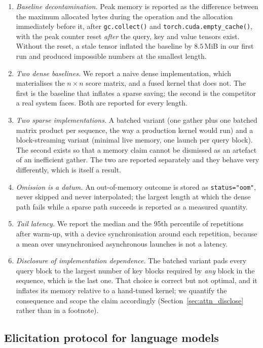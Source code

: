 \begin{enumerate}\itemsep2pt
\item \emph{Baseline decontamination.} Peak memory is reported as the difference
between the maximum allocated bytes during the operation and the allocation
immediately before it, after \texttt{gc.collect()} and
\texttt{torch.cuda.empty\_cache()}, with the peak counter reset \emph{after} the
query, key and value tensors exist. Without the reset, a stale tensor inflated the
baseline by $8.5$\,MiB in our first run and produced impossible numbers at the
smallest length.
\item \emph{Two dense baselines.} We report a naive dense implementation, which
materialises the $n\times n$ score matrix, and a fused kernel
\cite{dao2022flashattention} that does not. The first is the baseline that
inflates a sparse saving; the second is the competitor a real system faces. Both
are reported for every length.
\item \emph{Two sparse implementations.} A batched variant (one gather plus one
batched matrix product per sequence, the way a production kernel would run) and a
block-streaming variant (minimal live memory, one launch per query block). The
second exists so that a memory claim cannot be dismissed as an artefact of an
inefficient gather. The two are reported separately and they behave very
differently, which is itself a result.
\item \emph{Omission is a datum.} An out-of-memory outcome is stored as
\texttt{status="oom"}, never skipped and never interpolated; the largest length at
which the dense path fails while a sparse path succeeds is reported as a measured
quantity.
\item \emph{Tail latency.} We report the median and the 95th percentile of
\GpuReps{} repetitions after warm-up, with a device synchronisation around each
repetition, because a mean over unsynchronised asynchronous launches is not a
latency.
\item \emph{Disclosure of implementation dependence.} The batched variant pads
every query block to the largest number of key blocks required by \emph{any} block
in the sequence, which is the last one. That choice is correct but not optimal,
and it inflates its memory relative to a hand-tuned kernel; we quantify the
consequence and scope the claim accordingly (Section~\ref{sec:attn_disclose}
rather than in a footnote).
\end{enumerate}

\subsection{Elicitation protocol for language models}

